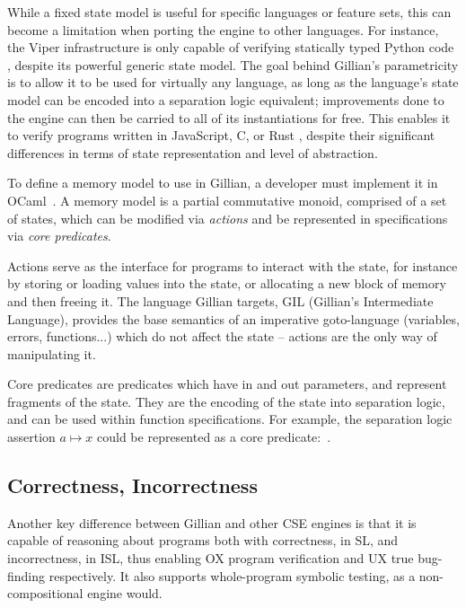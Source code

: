While a fixed state model is useful for specific languages or feature sets, this can become a limitation when porting the engine to other languages. For instance, the Viper infrastructure is only capable of verifying statically typed Python code \cite{nagini}, despite its powerful generic state model. The goal behind Gillian's parametricity is to allow it to be used for virtually any language, as long as the language's state model can be encoded into a separation logic equivalent; improvements done to the engine can then be carried to all of its instantiations for free. This enables it to verify programs written in JavaScript, C, or Rust \cite{gillian0,gillianrust}, despite their significant differences in terms of state representation and level of abstraction.

To define a memory model to use in Gillian, a developer must implement it in OCaml~\cite{ocaml}. A memory model is a partial commutative monoid, comprised of a set of states, which can be modified via \emph{actions} and be represented in specifications via \emph{core predicates}.

Actions serve as the interface for programs to interact with the state, for instance by storing or loading values into the state, or allocating a new block of memory and then freeing it. The language Gillian targets, GIL (Gillian's Intermediate Language), provides the base semantics of an imperative goto-language (variables, errors, functions...) which do not affect the state -- actions are the only way of manipulating it.

Core predicates are predicates which have in and out parameters, and represent fragments of the state. They are the encoding of the state into separation logic, and can be used within function specifications. For example, the separation logic assertion $a \mapsto x$ could be represented as a core \mbox{predicate: }.

\subsection{Correctness, Incorrectness}

Another key difference between Gillian and other CSE engines is that it is capable of reasoning about programs both with correctness, in SL, and incorrectness, in ISL, thus enabling OX program verification and UX true bug-finding respectively. It also supports whole-program symbolic testing, as a non-compositional engine would.

